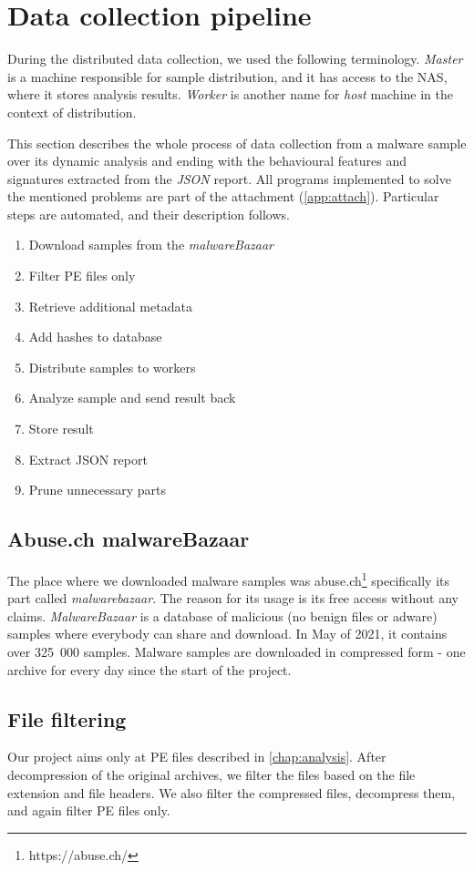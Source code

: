 \section{Data collection pipeline}
During the distributed data collection, we used the following terminology. \emph{Master} is a machine responsible for sample distribution, and it has access to the NAS, where it stores analysis results. \emph{Worker} is another name for \emph{host} machine in the context of distribution.

This section describes the whole process of data collection from a malware sample over its dynamic analysis and ending with the behavioural features and signatures extracted from the \emph{JSON} report. All programs implemented to solve the mentioned problems are part of the attachment (\ref{app:attach}). Particular steps are automated, and their description follows.

\begin{enumerate}
    \itemsep0em 
    \item Download samples from the \emph{malwareBazaar}
    \item Filter PE files only
    \item Retrieve additional metadata
    \item Add hashes to database
    \item Distribute samples to workers
    \item Analyze sample and send result back
    \item Store result
    \item Extract JSON report
    \item Prune unnecessary parts
\end{enumerate}


\subsection{Abuse.ch malwareBazaar}
The place where we downloaded malware samples was abuse.ch\footnote{https://abuse.ch/} specifically its part called \emph{malwarebazaar}. The reason for its usage is its free access without any claims. \emph{MalwareBazaar} is a database of malicious (no benign files or adware) samples where everybody can share and download. In May of 2021, it contains over 325~000 samples. Malware samples are downloaded in compressed form - one archive for every day since the start of the project.

\subsection{File filtering}
Our project aims only at PE files described in \ref{chap:analysis}. After decompression of the original archives, we filter the files based on the file extension and file headers. We also filter the compressed files, decompress them, and again filter PE files only.

